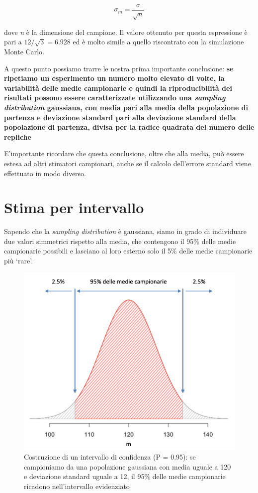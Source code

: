 \documentclass[a4paper,12pt,oneside]{book}
\begin{document}
\[\sigma_m  = \frac{\sigma }{\sqrt n }\]

dove \emph{n} è la dimensione del campione. Il valore ottenuto per questa espressione è pari a \(12/\sqrt{3} = 6.928\) ed è molto simile a quello riscontrato con la simulazione Monte Carlo.

A questo punto possiamo trarre le nostra prima importante conclusione: \textbf{se ripetiamo un esperimento un numero molto elevato di volte, la variabilità delle medie campionarie e quindi la riproducibilità dei risultati possono essere caratterizzate utilizzando una \emph{sampling distribution} gaussiana, con media pari alla media della popolazione di partenza e deviazione standard pari alla deviazione standard della popolazione di partenza, divisa per la radice quadrata del numero delle repliche}

E'importante ricordare che questa conclusione, oltre che alla media, può essere estesa ad altri stimatori campionari, anche se il calcolo dell'errore standard viene effettuato in modo diverso.

\hypertarget{stima-per-intervallo}{%
\section{Stima per intervallo}\label{stima-per-intervallo}}

Sapendo che la \emph{sampling distribution} è gaussiana, siamo in grado di individuare due valori simmetrici rispetto alla media, che contengono il 95\% delle medie campionarie possibili e lasciano al loro esterno solo il 5\% delle medie campionarie più `rare'.

\begin{figure}

{\centering \includegraphics[width=0.75\linewidth]{_images/ConfidenceInterval} 

}

\caption{Costruzione di un intervallo di confidenza (P = 0.95): se campioniamo da una popolazione gaussiana con media uguale a 120 e deviazione standard uguale a 12, il 95\% delle medie campionarie ricadono nell'intervallo evidenziato}\label{fig:figName62b}
\end{figure}
\end{document}
